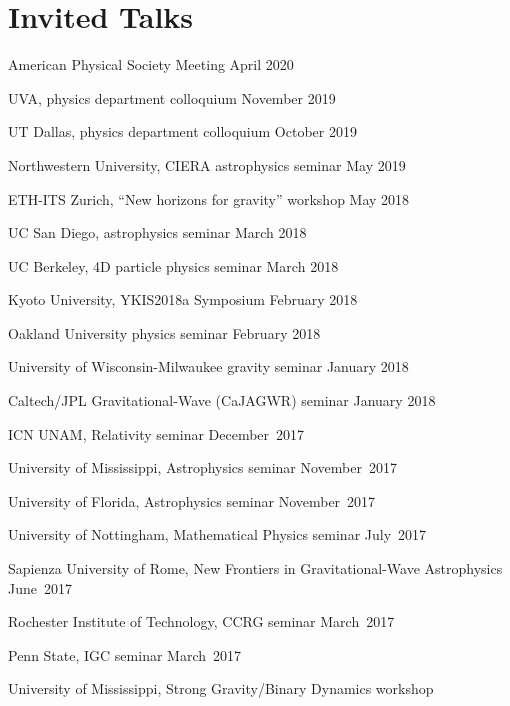 \newcommand{\playsymbol}{$\blacktriangleright$}
\section{\sc Invited Talks}
\begin{etaremune}
\item
  American Physical Society Meeting
  \hfill{}
  April 2020
\item
  UVA, physics department colloquium
  \hfill{}
  November 2019
\item
  UT Dallas, physics department colloquium
  \hfill{}
  October 2019
\item
  Northwestern University, CIERA astrophysics seminar
  \hfill{}
  May 2019
\item
  ETH-ITS Zurich, ``New horizons for gravity'' workshop
  \hfill{}
  May 2018
\item
  UC San Diego, astrophysics seminar
  \hfill{}
  March 2018
\item
  UC Berkeley, 4D particle physics seminar
  \hfill{}
  March 2018
\item
  Kyoto University, YKIS2018a Symposium
  \hfill{}
  February 2018
\item
  Oakland University physics seminar
  \hfill{}
  February 2018
\item
  University of Wisconsin-Milwaukee gravity seminar
  \hfill{}
  January 2018
\item
  Caltech/JPL Gravitational-Wave (CaJAGWR) seminar
  \hfill{}
  January 2018
\item
  ICN UNAM,
  Relativity seminar
  \hfill{}
  December~2017
\item
  University of Mississippi,
  Astrophysics seminar
  \hfill{}
  November~2017
\item
  University of Florida,
  Astrophysics seminar
  \hfill{}
  November~2017
\item
  University of Nottingham,
  Mathematical Physics seminar
  \hfill{}
  July~2017
\item
  Sapienza University of Rome,
  New Frontiers in Gravitational-Wave Astrophysics
  \hfill{}
  June~2017
\item
  Rochester Institute of Technology,
  CCRG seminar
  \hfill{}
  March~2017
\item
  Penn State,
  IGC seminar
  \hfill{}
  March~2017
\item
  University of Mississippi,
  Strong Gravity/Binary Dynamics workshop

\end{etaremune}
